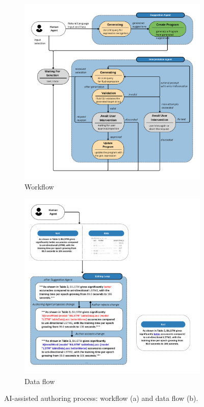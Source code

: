 \begin{figure}[ht]
    \centering
    \begin{subfigure}{0.48\linewidth}
        \centering
        \includegraphics[width=\linewidth]{fig/entire-workflow}
        \caption{Workflow}
        \label{fig:architecture}
    \end{subfigure}\hfill
    \begin{subfigure}{0.48\linewidth}
        \centering
        \includegraphics[width=\linewidth]{fig/data-flow}
        \caption{Data flow}
        \label{fig:dataflow}
    \end{subfigure}
    \caption{AI-assisted authoring process: workflow (a) and data flow (b).}
    \label{fig:overall-architecture}
\end{figure}



